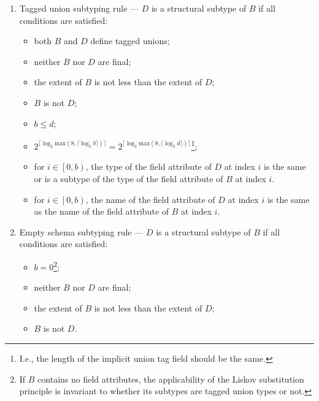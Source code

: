 \begin{enumerate}
    \item Tagged union subtyping rule --- $D$ is a structural subtype of $B$ if all conditions are satisfied:
    \begin{itemize}
        \item both $B$ and $D$ define tagged unions;
        \item neither $B$ nor $D$ are final;
        \item the extent of $B$ is not less than the extent of $D$;
        \item $B$ is not $D$;
        \item $b \leq d$;
        \item $2^{\lceil\log_2 \text{max}\left(8, \lceil\log_2 b\rceil\right)\rceil} =
               2^{\lceil\log_2 \text{max}\left(8, \lceil\log_2 d\rceil\right)\rceil}$\footnote{%
                  I.e., the length of the implicit union tag field should be the same.
              };
        \item for $i \in \left[0, b\right)$, the type of the field attribute of $D$ at index $i$
            is the same or is a subtype of the type of the field attribute of $B$ at index $i$.
        \item for $i \in \left[0, b\right)$, the name of the field attribute of $D$ at index $i$
            is the same as the name of the field attribute of $B$ at index $i$.
    \end{itemize}

    \item Empty schema subtyping rule --- $D$ is a structural subtype of $B$ if all conditions are satisfied:
    \begin{itemize}
        \item $b = 0$\footnote{%
            If $B$ contains no field attributes, the applicability of the Liskov substitution principle is invariant to
            whether its subtypes are tagged union types or not.
        };
        \item neither $B$ nor $D$ are final;
        \item the extent of $B$ is not less than the extent of $D$;
        \item $B$ is not $D$.
    \end{itemize}
\end{enumerate}

